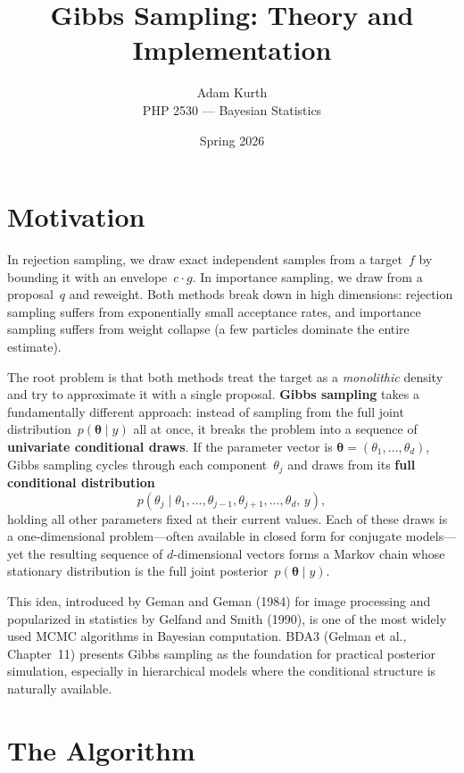 \documentclass[11pt]{article}
\title{Gibbs Sampling: Theory and Implementation}
\author{Adam Kurth \\ PHP 2530 --- Bayesian Statistics}
\date{Spring 2026}
\begin{document}
\maketitle

\section{Motivation}

In rejection sampling, we draw exact independent samples from a target~$f$ by bounding it with an envelope~$c\cdot g$.  In importance sampling, we draw from a proposal~$q$ and reweight.  Both methods break down in high dimensions: rejection sampling suffers from exponentially small acceptance rates, and importance sampling suffers from weight collapse (a few particles dominate the entire estimate).

The root problem is that both methods treat the target as a \emph{monolithic} density and try to approximate it with a single proposal.  \textbf{Gibbs sampling} takes a fundamentally different approach: instead of sampling from the full joint distribution~$p(\boldsymbol{\theta} \mid y)$ all at once, it breaks the problem into a sequence of \textbf{univariate conditional draws}.  If the parameter vector is $\boldsymbol{\theta} = (\theta_1, \ldots, \theta_d)$, Gibbs sampling cycles through each component~$\theta_j$ and draws from its \textbf{full conditional distribution}
\[
  p(\theta_j \mid \theta_1, \ldots, \theta_{j-1}, \theta_{j+1}, \ldots, \theta_d, \, y),
\]
holding all other parameters fixed at their current values.  Each of these draws is a one-dimensional problem---often available in closed form for conjugate models---yet the resulting sequence of $d$-dimensional vectors forms a Markov chain whose stationary distribution is the full joint posterior~$p(\boldsymbol{\theta} \mid y)$.

This idea, introduced by Geman and Geman (1984) for image processing and popularized in statistics by Gelfand and Smith (1990), is one of the most widely used MCMC algorithms in Bayesian computation.  BDA3 (Gelman et al., Chapter~11) presents Gibbs sampling as the foundation for practical posterior simulation, especially in hierarchical models where the conditional structure is naturally available.

\section{The Algorithm}
\end{document}
